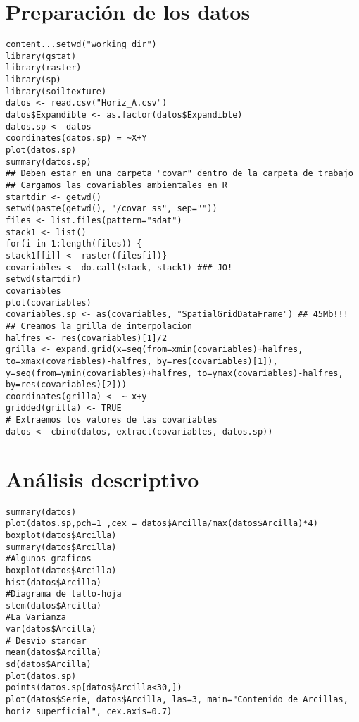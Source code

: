 \documentclass[10pt,a4paper]{article}
\begin{document}
\section{Preparación de los datos}
\begin{lstlisting}
content...setwd("working_dir")
library(gstat)
library(raster)
library(sp)
library(soiltexture)
datos <- read.csv("Horiz_A.csv")
datos$Expandible <- as.factor(datos$Expandible)
datos.sp <- datos
coordinates(datos.sp) = ~X+Y
plot(datos.sp)
summary(datos.sp)
## Deben estar en una carpeta "covar" dentro de la carpeta de trabajo
## Cargamos las covariables ambientales en R
startdir <- getwd()
setwd(paste(getwd(), "/covar_ss", sep=""))
files <- list.files(pattern="sdat")
stack1 <- list()
for(i in 1:length(files)) {
stack1[[i]] <- raster(files[i])}
covariables <- do.call(stack, stack1) ### JO!
setwd(startdir)
covariables
plot(covariables)
covariables.sp <- as(covariables, "SpatialGridDataFrame") ## 45Mb!!!
## Creamos la grilla de interpolacion
halfres <- res(covariables)[1]/2
grilla <- expand.grid(x=seq(from=xmin(covariables)+halfres, to=xmax(covariables)-halfres, by=res(covariables)[1]), y=seq(from=ymin(covariables)+halfres, to=ymax(covariables)-halfres, by=res(covariables)[2]))
coordinates(grilla) <- ~ x+y
gridded(grilla) <- TRUE
# Extraemos los valores de las covariables
datos <- cbind(datos, extract(covariables, datos.sp))
\end{lstlisting}

\section{Análisis descriptivo}
\begin{lstlisting}
summary(datos)
plot(datos.sp,pch=1 ,cex = datos$Arcilla/max(datos$Arcilla)*4)
boxplot(datos$Arcilla)
summary(datos$Arcilla)
#Algunos graficos
boxplot(datos$Arcilla)
hist(datos$Arcilla)
#Diagrama de tallo-hoja
stem(datos$Arcilla)
#La Varianza
var(datos$Arcilla)
# Desvio standar
mean(datos$Arcilla)
sd(datos$Arcilla)
plot(datos.sp)
points(datos.sp[datos$Arcilla<30,])
plot(datos$Serie, datos$Arcilla, las=3, main="Contenido de Arcillas, horiz superficial", cex.axis=0.7)
\end{lstlisting}
\end{document}
